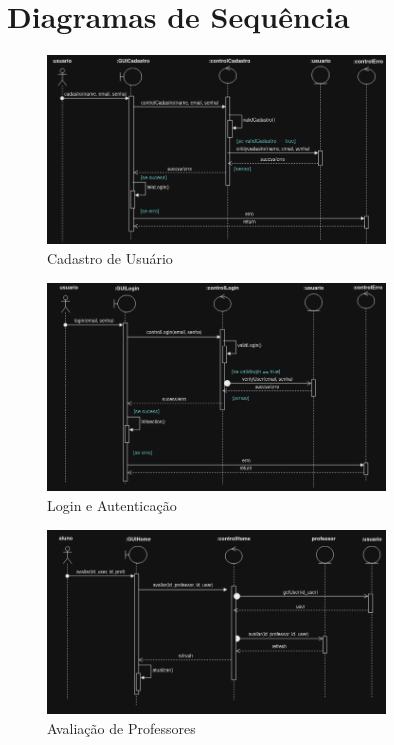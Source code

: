 \documentclass[12pt]{article}
\begin{document}
\section{Diagramas de Sequência}

\begin{figure}[H] %
    \centering
    \includegraphics[width=0.8\textwidth]{diagramas/i1-cadastro-usuario.png}
    \caption{Cadastro de Usuário}
    \label{fig:i1-cadastro-usuario}
\end{figure}

\begin{figure}[H]
    \centering
    \includegraphics[width=0.8\textwidth]{diagramas/i2-login-autent.png}
    \caption{Login e Autenticação}
    \label{fig:i2-login-autent}
\end{figure}

\begin{figure}[H]
    \centering
    \includegraphics[width=0.8\textwidth]{diagramas/i3-avaliac-professores.png}
    \caption{Avaliação de Professores}
    \label{fig:i3-avaliac-professores}
\end{figure}
\end{document}
